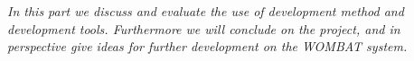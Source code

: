 \textit{In this part we discuss and evaluate the use of development method and development tools. Furthermore we will conclude on the project, and in perspective give ideas for further development on the WOMBAT system.}